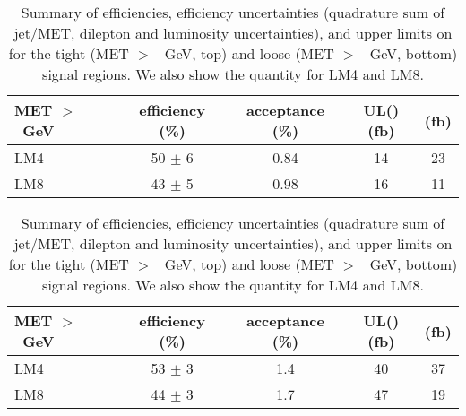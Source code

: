 \begin{table}[hbt]
  \begin{center}
	\caption{
	  \label{tab:models} 
	  Summary of efficiencies, efficiency uncertainties (quadrature sum
	  of jet/MET, dilepton and luminosity uncertainties), 
	  and upper limits on \sta %
	  for the tight (MET $>$ \signalmett~GeV, top)
	  and loose (MET $>$ \signalmetl~GeV, bottom) signal regions.
	  We also show the quantity
	  \sta %
	  for LM4 and LM8.}

	\medskip
	\begin{tabular}{l|cccc}
	  \hline
	  \bf MET $>$ \signalmett~GeV & efficiency (\%) & acceptance (\%) & UL(\sta)(fb) & \sta(fb) \\
	  \hline
	  LM4  &  50 $\pm$   6  &  0.84  &  14  &  23  \\
	  LM8  &  43 $\pm$   5  &  0.98  &  16  &  11  \\
	  \hline
	\end{tabular}

	\medskip
	\begin{tabular}{l|cccc}
	  \hline
	  \bf MET $>$ \signalmetl~GeV & efficiency (\%) & acceptance (\%) & UL(\sta)(fb) & \sta(fb) \\
	  \hline
	  LM4 &  53 $\pm$   3  &  1.4  &   40  &   37  \\
	  LM8 &  44 $\pm$   3  &  1.7  &   47  &   19  \\

	  \hline
	\end{tabular}

	\begin{comment}

	  \begin{tabular}{l|ccc}

		\hline
		& $t\bar{t}$    & LM4     & LM8       \\
		\hline
			{\bf Loose signal region}                &               &         &           \\
			Efficiency                               &       0.43    & 0.54    & 0.45      \\
			Efficiency Uncertainty                   &       0.15    & 0.12    & 0.12      \\
			UL($\sigma \times BF \times A$) (pb)     &       0.56    & 0.44    & 0.53      \\
			$\sigma \times BF \times A$ (pb)         &               & 0.045   & 0.025     \\


\end{comment}
\end{center}
\end{table}
